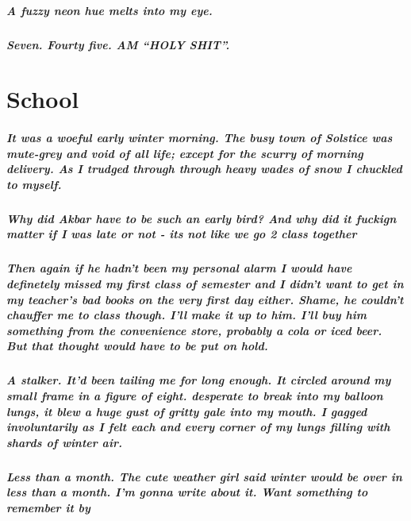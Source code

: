 \documentclass{book}
\begin{document}
\paragraph{A fuzzy neon hue melts into my eye.}
\paragraph{Seven. Fourty five. AM ``HOLY SHIT''.}
\chapter{School}
\paragraph{It was a woeful early winter morning. The busy town of Solstice was mute-grey and void of all life; except for the scurry of morning delivery. As I trudged through through heavy wades of snow I chuckled to myself.}
\paragraph{\textit{Why did Akbar have to be such an early bird? And why did it fuckign matter if I was late or not - its not like we go 2 class together}}
\paragraph{Then again if he hadn't been my personal alarm I would have definetely missed my first class of semester and I didn't want to get in my teacher's bad books on the very first day either. Shame, he couldn't chauffer me to class though. I'll make it up to him. I'll buy him something from the convenience store, probably a cola or iced beer. But that thought would have to be put on hold.}
\paragraph{A stalker. It'd been tailing me for long enough. It circled around my small frame in a figure of eight. desperate to break into my balloon lungs, it blew a huge gust of gritty gale into my mouth. I gagged involuntarily as I felt each and every corner of my lungs filling with shards of winter air.}
\paragraph{\textit{Less than a month. The cute weather girl said winter would be over in less than a month. I'm gonna write about it. Want something to remember it by}}
\end{document}
